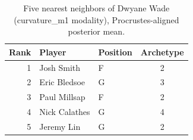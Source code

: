 \begin{table}[htbp]
  \centering\small
  \begin{tabular}{rllc}
    \toprule
    Rank & Player & Position & Archetype \\
    \midrule
    1 & Josh Smith & F & 2 \\
    2 & Eric Bledsoe & G & 3 \\
    3 & Paul Millsap & F & 2 \\
    4 & Nick Calathes & G & 4 \\
    5 & Jeremy Lin & G & 2 \\
    \bottomrule
  \end{tabular}
  \caption{Five nearest neighbors of Dwyane Wade (curvature_m1 modality), Procrustes-aligned posterior mean.}
  \label{tab:Dwyane_Wade_neighbors_curvature_m1}
\end{table}

